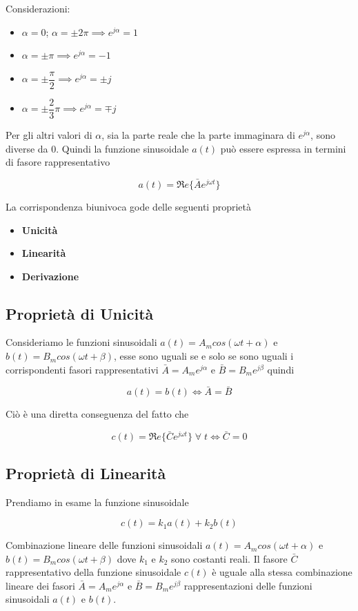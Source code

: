 \documentclass[a4paper]{report}
\begin{document}
Considerazioni:
\begin{itemize}
\item $\alpha = 0$; $\alpha=\pm 2\pi \implies e^{j\alpha} = 1$
\item $\alpha = \pm \pi \implies e^{j\alpha} = -1$
\item $\alpha = \pm \dfrac{\pi}{2} \implies e^{j\alpha} = \pm j$
\item $\alpha = \pm \dfrac{2}{3}\pi \implies e^{j\alpha} = \mp j$
\end{itemize}
Per gli altri valori di $\alpha$, sia la parte reale che la parte
immaginara di $e^{j\alpha}$, sono diverse da $0$.
Quindi la funzione sinusoidale $a(t)$ pu\`o essere espressa in termini
di fasore rappresentativo

\[
a(t)=\Re e\{\bar{A}e^{j\omega t}\}
\]

La corrispondenza biunivoca gode delle seguenti propriet\`a
\begin{itemize}
\item {\bf Unicit\`a}
\item {\bf Linearit\`a}
\item {\bf Derivazione}
\end{itemize}

\subsection{Propriet\`a di Unicit\`a}
Consideriamo le funzioni sinusoidali $a(t) = A_mcos(\omega t+\alpha)$ e
$b(t) = B_mcos(\omega t+\beta)$, esse sono uguali se e solo se sono
uguali i corrispondenti fasori rappresentativi $\bar{A} =
A_me^{j\alpha}$ e $\bar{B} = B_me^{j\beta}$ quindi

\[
a(t)=b(t) \Longleftrightarrow \bar{A}=\bar{B}
\]

Ci\`o \`e una diretta conseguenza del fatto che

\[
c(t)=\Re e \{ \bar{C}e^{j\omega t} \}\; \forall\; t \Longleftrightarrow
\bar{C}=0
\]

\subsection{Propriet\`a di Linearit\`a}
Prendiamo in esame la funzione sinusoidale

\[
c(t) = k_1a(t)+k_2b(t)
\]

Combinazione lineare delle funzioni sinusoidali $a(t) = A_mcos(\omega
t + \alpha)$ e \\$b(t) = B_mcos(\omega t + \beta)$ dove $k_1$ e $k_2$
sono costanti reali.
Il fasore $\bar{C}$ rappresentativo della funzione sinusoidale $c(t)$
\`e uguale alla stessa combinazione lineare dei fasori $\bar{A} =
A_me^{j\alpha}$ e $\bar{B} = B_me^{j\beta}$ rappresentazioni delle
funzioni sinusoidali $a(t)$ e $b(t)$.
\end{document}
